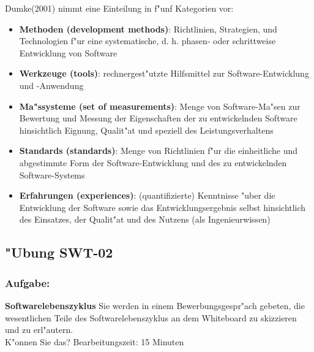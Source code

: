 \newpage

Dumke(2001)\supercite{Dumke2001} nimmt eine Einteilung in f"unf Kategorien vor:
\bigbreak
\begin{itemize}
\item \textbf{Methoden (development methods)}: \smallbreak Richtlinien, Strategien, und Technologien f"ur eine systematische, d. h. phasen- oder schrittweise Entwicklung von Software

\item \textbf{Werkzeuge (tools)}: \smallbreak rechnergest"utzte Hilfsmittel zur Software-Entwicklung und -Anwendung

\item \textbf{Ma"ssysteme (set of measurements)}: \smallbreak Menge von Software-Ma"sen zur Bewertung und Messung der Eigenschaften der zu entwickelnden Software hinsichtlich Eignung, Qualit"at und speziell des Leistungsverhaltens

\item \textbf{Standards (standards)}: \smallbreak Menge von Richtlinien f"ur die einheitliche und abgestimmte Form der Software-Entwicklung und des zu entwickelnden Software-Systems

\item \textbf{Erfahrungen (experiences)}: \smallbreak (quantifizierte) Kenntnisse "uber die Entwicklung der Software sowie das Entwicklungsergebnis selbst hinsichtlich des Einsatzes, der Qualit"at und des Nutzens (als Ingenieurwissen)
\end{itemize}


\newtheorem{defi}{Definition:}
\newpage
\subsection{"Ubung SWT-02}
\subsubsection*{Aufgabe:}

\begin{framed}
\textbf{Softwarelebenszyklus}
\smallbreak
Sie werden in einem Bewerbungsgespr"ach gebeten, die wesentlichen Teile des Softwarelebenszyklus an dem Whiteboard zu skizzieren und zu erl"autern.
\\ K"onnen Sie das?
\bigbreak
\small Bearbeitungszeit: 15 Minuten
\end{framed}
\bigbreak
\bigbreak
